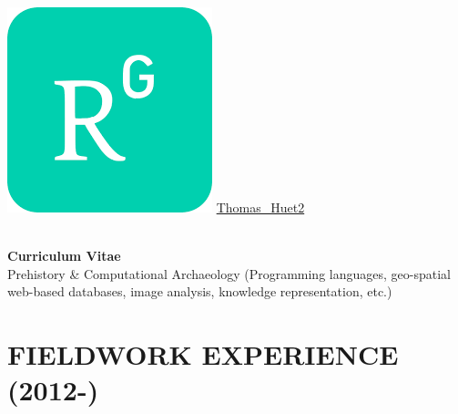 \documentclass{article}
\begin{document}
\includegraphics[scale=0.05]{rgate} \quad \href{https://www.researchgate.net/profile/Thomas\_Huet2}{Thomas\_Huet2} \\
\\

\begin{adjustwidth}{50pt}{50pt}
\begin{center}
\large{\textbf{Curriculum Vitae}}\\
\large{Prehistory \& Computational Archaeology (Programming languages, geo-spatial web-based databases, image analysis, knowledge representation, etc.)} 
\end{center}
\end{adjustwidth}

\tableofcontents

\section{FIELDWORK EXPERIENCE (2012-)}
\end{document}
